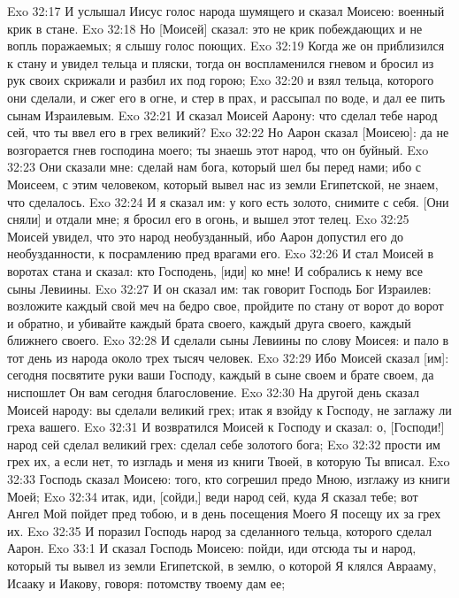 \vs Exo 32:17 И услышал Иисус голос народа шумящего и сказал Моисею: военный крик в стане.
\vs Exo 32:18 Но [Моисей] сказал: это не крик побеждающих и не вопль поражаемых; я слышу голос поющих.
\vs Exo 32:19 Когда же он приблизился к стану и увидел тельца и пляски, тогда он воспламенился гневом и бросил из рук своих скрижали и разбил их под горою;
\vs Exo 32:20 и взял тельца, которого они сделали, и сжег его в огне, и стер в прах, и рассыпал по воде, и дал ее пить сынам Израилевым.
\vs Exo 32:21 И сказал Моисей Аарону: что сделал тебе народ сей, что ты ввел его в грех великий?
\vs Exo 32:22 Но Аарон сказал [Моисею]: да не возгорается гнев господина моего; ты знаешь этот народ, что он буйный.
\vs Exo 32:23 Они сказали мне: сделай нам бога, который шел бы перед нами; ибо с Моисеем, с этим человеком, который вывел нас из земли Египетской, не знаем, что сделалось.
\vs Exo 32:24 И я сказал им: у кого есть золото, снимите с себя. [Они сняли] и отдали мне; я бросил его в огонь, и вышел этот телец.
\rsbpar\vs Exo 32:25 Моисей увидел, что это народ необузданный, ибо Аарон допустил его до необузданности, к посрамлению пред врагами его.
\vs Exo 32:26 И стал Моисей в воротах стана и сказал: кто Господень, [иди] ко мне! И собрались к нему все сыны Левиины.
\vs Exo 32:27 И он сказал им: так говорит Господь Бог Израилев: возложите каждый свой меч на бедро свое, пройдите по стану от ворот до ворот и обратно, и убивайте каждый брата своего, каждый друга своего, каждый ближнего своего.
\vs Exo 32:28 И сделали сыны Левиины по слову Моисея: и пало в тот день из народа около трех тысяч человек.
\vs Exo 32:29 Ибо Моисей сказал [им]: сегодня посвятите руки ваши Господу, каждый в сыне своем и брате своем, да ниспошлет Он вам сегодня благословение.
\rsbpar\vs Exo 32:30 На другой день сказал Моисей народу: вы сделали великий грех; итак я взойду к Господу, не заглажу ли греха вашего.
\vs Exo 32:31 И возвратился Моисей к Господу и сказал: о, [Господи!] народ сей сделал великий грех: сделал себе золотого бога;
\vs Exo 32:32 прости им грех их, а если нет, то изгладь и меня из книги Твоей, в которую Ты вписал.
\vs Exo 32:33 Господь сказал Моисею: того, кто согрешил предо Мною, изглажу из книги Моей;
\vs Exo 32:34 итак, иди, [сойди,] веди народ сей, куда Я сказал тебе; вот Ангел Мой пойдет пред тобою, и в день посещения Моего Я посещу их за грех их.
\vs Exo 32:35 И поразил Господь народ за сделанного тельца, которого сделал Аарон.
\vs Exo 33:1 И сказал Господь Моисею: пойди, иди отсюда ты и народ, который ты вывел из земли Египетской, в землю, о которой Я клялся Аврааму, Исааку и Иакову, говоря: потомству твоему дам ее;
